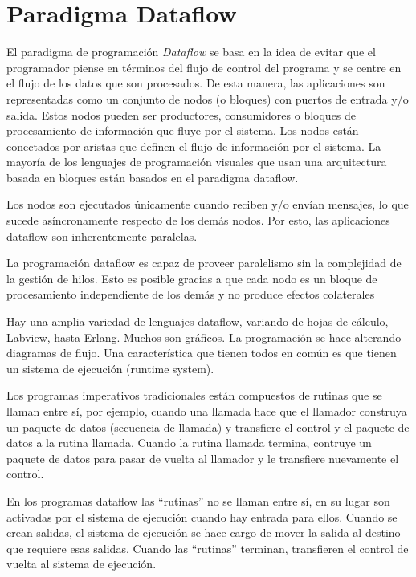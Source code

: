 \section{Paradigma Dataflow}

El paradigma de programación \textit{Dataflow} se basa en la idea de evitar que
el programador piense en términos del flujo de control del programa y se centre
en el flujo de los datos que son procesados.
De esta manera, las aplicaciones son representadas como un conjunto de nodos (o
bloques) con puertos de entrada y/o salida. Estos nodos pueden ser productores,
consumidores o bloques de procesamiento de información que fluye por el sistema. Los nodos
están conectados por aristas que definen el flujo de información por el
sistema. La mayoría de los lenguajes de programación visuales que usan una
arquitectura basada en bloques están basados en el paradigma dataflow.
\cite{DataflowTiagoSousa}

Los nodos son ejecutados únicamente cuando reciben y/o envían mensajes, lo que
sucede asíncronamente respecto de los demás nodos. Por esto, las aplicaciones
dataflow son inherentemente paralelas.\cite{DataflowRichardHarter}

La programación dataflow es capaz de proveer paralelismo sin la complejidad de
la gestión de hilos. Esto es posible gracias a que cada nodo es un bloque de
procesamiento independiente de los demás y no produce efectos colaterales
\cite{DataflowTiagoSousa}

Hay una amplia variedad de lenguajes dataflow, variando de hojas de cálculo,
Labview, hasta Erlang. Muchos son gráficos. La programación se hace alterando
diagramas de flujo. Una característica que tienen todos en común es que tienen
un sistema de ejecución (runtime system).\cite{DataflowRichardHarter}

Los programas imperativos tradicionales están compuestos de rutinas que se
llaman entre sí, por ejemplo, cuando una llamada hace que el llamador construya
un paquete de datos (secuencia de llamada) y transfiere el control y el paquete
de datos a la rutina llamada. Cuando la rutina llamada termina, contruye un
paquete de datos para pasar de vuelta al llamador y le transfiere nuevamente el control.

En los programas dataflow las “rutinas” no se llaman entre sí, en su lugar son
activadas por el sistema de ejecución cuando hay entrada para ellos. Cuando se
crean salidas, el sistema de ejecución se hace cargo de mover la salida al
destino que requiere esas salidas. Cuando las “rutinas” terminan, transfieren el
control de vuelta al sistema de ejecución.

